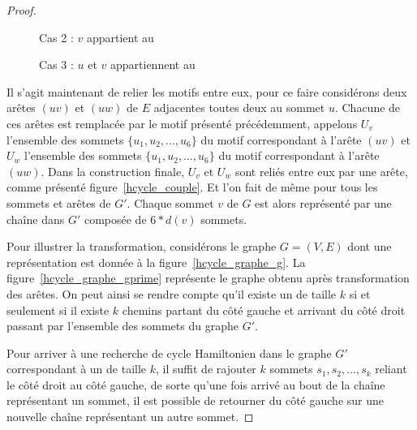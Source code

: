 \begin{proof}
    \begin{figure}
        \begin{center}
            \begin{tikzpicture}
                
            \end{tikzpicture}
            \caption{Cas 2 : $v$ appartient au \vcover}
            \label{motif_v}
        \end{center}
    \end{figure}

    \begin{figure}
        \begin{center}
            \begin{tikzpicture}
                
            \end{tikzpicture}
            \caption{Cas 3 : $u$ et $v$ appartiennent au \vcover}
            \label{motif_uv}
        \end{center}
    \end{figure}

    Il s'agit maintenant de relier les motifs entre eux, pour ce faire considérons deux arêtes
    $(uv)$ et $(uw)$ de $E$ adjacentes toutes deux au sommet $u$. Chacune de ces arêtes est remplacée
    par le motif présenté précédemment, appelons $U_v$ l'ensemble des sommets $\{u_1, u_2, \dots,
    u_6\}$ du motif correspondant à l'arête $(uv)$ et $U_w$ l'ensemble des sommets $\{u_1, u_2,
    \dots, u_6\}$ du motif correspondant à l'arête $(uw)$. Dans la construction finale, $U_v$ et
    $U_w$ sont reliés entre eux par une arête, comme présenté figure~\ref{hcycle_couple}. Et l'on
    fait de même pour tous les sommets et arêtes de $G'$. Chaque sommet $v$ de $G$ est alors représenté
    par une chaîne dans $G'$ composée de $6*d(v)$ sommets.

    Pour illustrer la transformation, considérons le graphe $G = (V, E)$ dont une représentation est
    donnée à la figure~\ref{hcycle_graphe_g}. La figure~\ref{hcycle_graphe_gprime} représente le
    graphe obtenu après transformation des arêtes. On peut ainsi se rendre compte qu'il existe un
    \vcover de taille $k$ si et seulement si il existe $k$ chemins partant du côté gauche et
    arrivant du côté droit passant par l'ensemble des sommets du graphe $G'$.

    Pour arriver à une recherche de cycle Hamiltonien dans le graphe $G'$ correspondant à un \vcover de taille
    $k$, il suffit de rajouter $k$ sommets $s_1, s_2, \dots, s_k$ reliant le côté droit au côté
    gauche, de sorte qu'une fois arrivé au bout de la chaîne représentant un sommet, il est possible
    de retourner du côté gauche sur une nouvelle chaîne représentant un autre sommet.


\end{proof}
